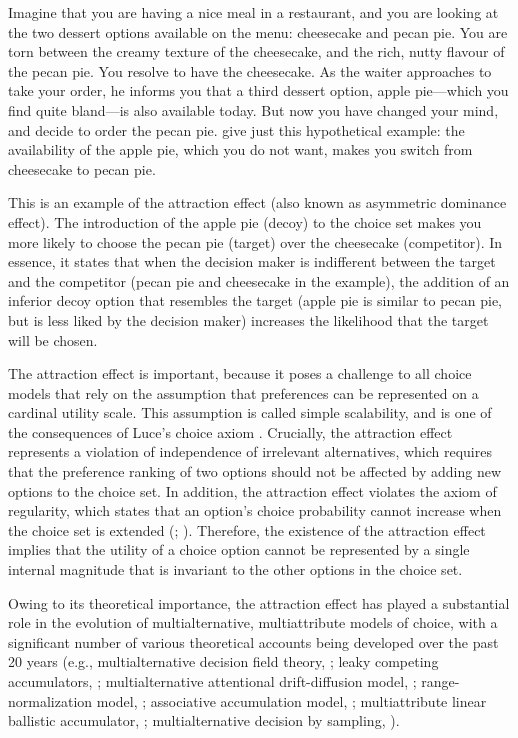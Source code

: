 \documentclass[12pt, a4paper]{article}
\begin{document}
Imagine that you are having a nice meal in a restaurant, and you are looking at the two dessert options available on the menu: cheesecake and pecan pie. You are torn between the creamy texture of the cheesecake, and the rich, nutty flavour of the pecan pie. You resolve to have the cheesecake. As the waiter approaches to take your order, he informs you that a third dessert option, apple pie---which you find quite bland---is also available today. But now you have changed your mind, and decide to order the pecan pie.  give just this hypothetical example: the availability of the apple pie, which you do not want, makes you switch from cheesecake to pecan pie.

This is an example of the attraction effect (also known as asymmetric dominance effect). The introduction of the apple pie (decoy) to the choice set makes you more likely to choose the pecan pie (target) over the cheesecake (competitor). In essence, it states that when the decision maker is indifferent between the target and the competitor (pecan pie and cheesecake in the example), the addition of an inferior decoy option that resembles the target (apple pie is similar to pecan pie, but is less liked by the decision maker) increases the likelihood that the target will be chosen.


The attraction effect is important, because it poses a challenge to all choice models that rely on the assumption that preferences can be represented on a cardinal utility scale. This assumption is called simple scalability, and is one of the consequences of Luce's choice axiom \cite{Luce1959}. Crucially, the attraction effect represents a violation of independence of irrelevant alternatives, which requires that the preference ranking of two options should not be affected by adding new options to the choice set. In addition, the attraction effect violates the axiom of regularity, which states that an option's choice probability cannot increase when the choice set is extended (; ). Therefore, the existence of the attraction effect implies that the utility of a choice option cannot be represented by a single internal magnitude that is invariant to the other options in the choice set.

Owing to its theoretical importance, the attraction effect has played a substantial role in the evolution of multialternative, multiattribute models of choice, with a significant number of various theoretical accounts being developed over the past 20 years (e.g., multialternative decision field theory, ; leaky competing accumulators, ; multialternative attentional drift-diffusion model,   ; range-normalization model, ; associative accumulation model, ; multiattribute linear ballistic accumulator, ; multialternative decision by sampling, ).
\end{document}
